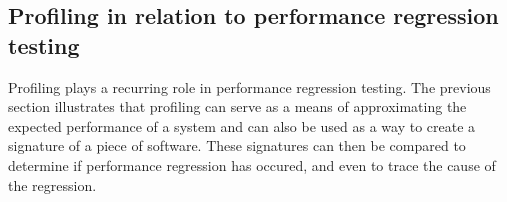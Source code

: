 \subsection{Profiling in relation to performance regression testing}
Profiling plays a recurring role in performance regression testing. The previous section illustrates that profiling can serve as a means of approximating the expected performance of a system \cite{profile_based_detection}\cite{performance_puzzles} and can also be used as a way to create a signature of a piece of software. These signatures can then be compared to determine if performance regression has occured, and even to trace the cause of the regression.



